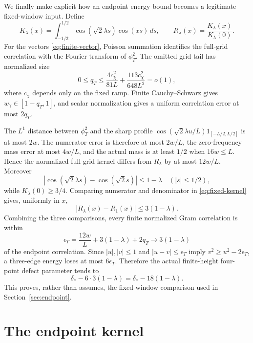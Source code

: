 \documentclass[11pt,reqno]{amsart}
\theoremstyle{definition}
\theoremstyle{remark}
\begin{document}
We finally make explicit how an endpoint energy bound becomes a legitimate
fixed-window input.  Define
\begin{equation}\label{eq:fixed-kernel}
 K_\lambda(x)=\int_{-1/2}^{1/2}
   \cos(\sqrt2\lambda s)\cos(xs)\,ds,\qquad
 R_\lambda(x)=\frac{K_\lambda(x)}{K_\lambda(0)}.
\end{equation}
For the vectors \eqref{eq:finite-vector}, Poisson summation identifies the
full-grid correlation with the Fourier transform of $\phi_T^2$.  The omitted
grid tail has normalized size
\begin{equation}\label{eq:grid-tail}
 0\le q_T\le
 \frac{4c_\chi^2}{81L}+\frac{113c_\chi^2}{648L^2}=o(1),
\end{equation}
where $c_\chi$ depends only on the fixed ramp.  Finite Cauchy--Schwarz gives
$w_\gamma\in[1-q_T,1]$, and scalar normalization gives a uniform correlation
error at most $2q_T$.

The $L^1$ distance between $\phi_T^2$ and the sharp profile
$\cos(\sqrt2\lambda u/L)1_{[-L/2,L/2]}$ is at most $2w$.  The numerator error
is therefore at most $2w/L$, the zero-frequency mass error at most $4w/L$,
and the actual mass is at least $1/2$ when $16w\le L$.  Hence the normalized
full-grid kernel differs from $R_\lambda$ by at most $12w/L$.  Moreover
\[
 |\cos(\sqrt2\lambda s)-\cos(\sqrt2s)|\le1-\lambda
 \quad(|s|\le1/2),
\]
while $K_\lambda(0)\ge3/4$.  Comparing numerator and denominator in
\eqref{eq:fixed-kernel} gives, uniformly in $x$,
\begin{equation}\label{eq:kernel-comparison}
 |R_\lambda(x)-R_1(x)|\le3(1-\lambda).
\end{equation}
Combining the three comparisons, every finite normalized Gram correlation is
within
\begin{equation}\label{eq:correlation-error}
 \epsilon_T=\frac{12w}{L}+3(1-\lambda)+2q_T
 \longrightarrow3(1-\lambda)
\end{equation}
of the endpoint correlation.  Since $|u|,|v|\le1$ and $|u-v|\le\epsilon_T$
imply $v^2\ge u^2-2\epsilon_T$, a three-edge energy loses at most
$6\epsilon_T$.  Therefore the actual finite-height four-point defect
parameter tends to
\begin{equation}\label{eq:eighteen-loss}
 \delta_*-6\cdot3(1-\lambda)=\delta_*-18(1-\lambda).
\end{equation}
This proves, rather than assumes, the fixed-window comparison used in
Section~\ref{sec:endpoint}.

\section{The endpoint kernel}
\end{document}
